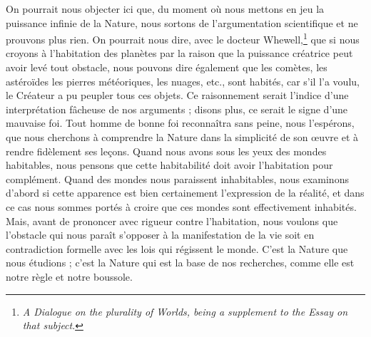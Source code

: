 \documentclass[a4paper, 11pt, oneside, landscape]{article}
\begin{document}
On pourrait nous objecter ici que, du moment où nous mettons en jeu la puissance infinie de la Nature, nous sortons de l'argumentation scientifique et ne prouvons plus rien. On pourrait nous dire, avec le docteur Whewell,\footnote{\emph{A Dialogue on the plurality of Worlds, being a supplement to the Essay on that subject}.} que si nous croyons à l'habitation des planètes par la raison que la puissance créatrice peut avoir levé tout obstacle, nous pouvons dire également que les comètes, les astéroïdes les pierres météoriques, les nuages, etc., sont habités, car s'il l'a voulu, le Créateur a pu peupler tous ces objets. Ce raisonnement serait l'indice d'une interprétation fâcheuse de nos arguments ; disons plus, ce serait le signe d'une mauvaise foi. Tout homme de bonne foi reconnaîtra sans peine, nous l'espérons, que nous cherchons à comprendre la Nature dans la simplicité de son œuvre et à rendre fidèlement ses leçons. Quand nous avons sous les yeux des mondes habitables, nous pensons que cette habitabilité doit avoir l'habitation pour complément. Quand des mondes nous paraissent inhabitables, nous examinons d'abord si cette apparence est bien certainement l'expression de la réalité, et dans ce cas nous sommes portés à croire que ces mondes sont effectivement inhabités. Mais, avant de prononcer avec rigueur contre l'habitation, nous voulons que l'obstacle qui nous paraît s'opposer à la manifestation de la vie soit en contradiction formelle avec les lois qui régissent le monde. C'est la Nature que nous étudions ; c'est la Nature qui est la base de nos recherches, comme elle est notre règle et notre boussole.
\end{document}
